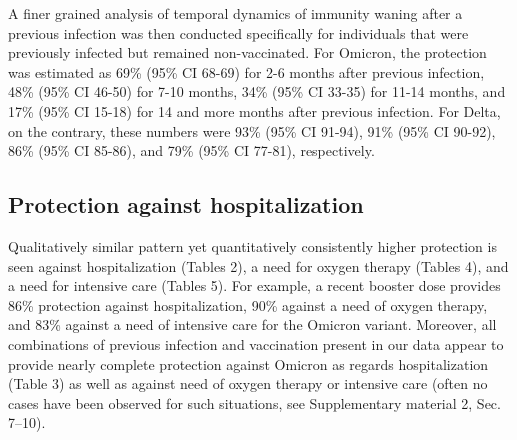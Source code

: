 \documentclass[a4paper,12pt]{article}
\newcommand{\inputtable}[1]{}
\def\tabHalone{2}
\def\tabHinteractions{3}
\def\tabOalone{4}
\def\tabUalone{5}
\begin{document}
\inputtable{smid_protection_against_omicron_tab1.inc}

A finer grained analysis of temporal dynamics of immunity waning after a previous infection was then conducted specifically for individuals that were previously infected but remained non-vaccinated. For Omicron, the protection was estimated as 69\% (95\% CI 68-69) for 2-6 months after previous infection,  48\% (95\% CI 46-50) for 7-10 months, 34\% (95\% CI 33-35) for 11-14 months, and 17\% (95\% CI 15-18) for 14 and more months after previous infection. For Delta, on the contrary, these numbers were 93\% (95\% CI 91-94), 91\% (95\% CI 90-92), 86\% (95\% CI 85-86), and 79\% (95\% CI 77-81), respectively.

\subsection*{Protection against hospitalization}

Qualitatively similar pattern yet quantitatively consistently higher protection is seen against hospitalization (Tables \tabHalone), a need for oxygen therapy (Tables \tabOalone), and a need for intensive care (Tables \tabUalone). 
For example, a recent booster dose provides 86\% protection against hospitalization, 90\% against a need of oxygen therapy, and 83\% against a need of intensive care for the Omicron variant. Moreover, all combinations of previous infection and vaccination present in our data appear to provide nearly complete protection against Omicron as regards hospitalization (Table \tabHinteractions) as well as against need of oxygen therapy or intensive care (often no cases have been observed for such situations, see Supplementary material 2, Sec. 7--10).

\inputtable{smid_protection_against_omicron_tab2.inc}

\inputtable{smid_protection_against_omicron_tab3.inc}

\inputtable{smid_protection_against_omicron_tab4.inc}
\end{document}

